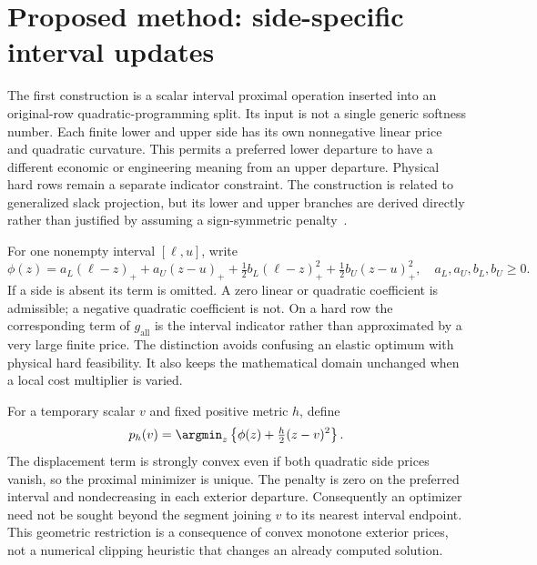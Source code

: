 \section{Proposed method: side-specific interval updates}\label{sec:separable}
The first construction is a scalar interval proximal operation inserted
into an original-row quadratic-programming split. Its input is not a
single generic softness number. Each finite lower and upper side has its
own nonnegative linear price and quadratic curvature. This permits a
preferred lower departure to have a different economic or engineering
meaning from an upper departure. Physical hard rows remain a separate
indicator constraint. The construction is related to generalized slack
projection, but its lower and upper branches are derived directly rather
than justified by assuming a sign-symmetric penalty~\cite{gsp,lew}.

For one nonempty interval $[\ell,u]$, write
\begin{equation}\label{eq:paper-side-cost}
 \phi(z)=a_L(\ell-z)_++a_U(z-u)_+
       +\tfrac12b_L(\ell-z)_+^2+\tfrac12b_U(z-u)_+^2,
 \quad a_L,a_U,b_L,b_U\geq0.
\end{equation}
If a side is absent its term is omitted. A zero linear or quadratic
coefficient is admissible; a negative quadratic coefficient is not. On a
hard row the corresponding term of $g_{\mathrm{all}}$ is the interval indicator rather than approximated
by a very large finite price. The distinction avoids confusing an elastic
optimum with physical hard feasibility. It also keeps the mathematical
domain unchanged when a local cost multiplier is varied.

For a temporary scalar $v$ and fixed positive metric $h$, define
\begin{equation}\label{eq:paper-scalar-prox}
 p_h(v)=\argmin_z\left\{\phi(z)+\tfrac h2(z-v)^2\right\}.
\end{equation}
The displacement term is strongly convex even if both quadratic side
prices vanish, so the proximal minimizer is unique. The penalty is zero
on the preferred interval and nondecreasing in each exterior departure.
Consequently an optimizer need not be sought beyond the segment joining
$v$ to its nearest interval endpoint. This geometric restriction is a
consequence of convex monotone exterior prices, not a numerical clipping
heuristic that changes an already computed solution.

